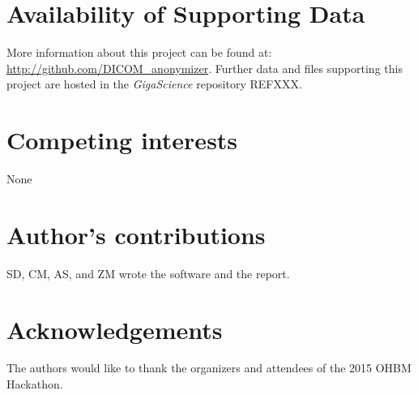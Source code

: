 \documentclass[twocolumn]{bmcart}%
\begin{document}
\begin{backmatter}

\section*{Availability of Supporting Data}
More information about this project can be found at: \url{http://github.com/DICOM\_anonymizer}. Further data and files supporting this project are hosted in the \emph{GigaScience} repository REFXXX.

\section*{Competing interests}
None

\section*{Author's contributions}
SD, CM, AS, and ZM wrote the software and the report.

\section*{Acknowledgements}
The authors would like to thank the organizers and attendees of the 2015
OHBM Hackathon.

  
  


\end{backmatter}
\end{document}

